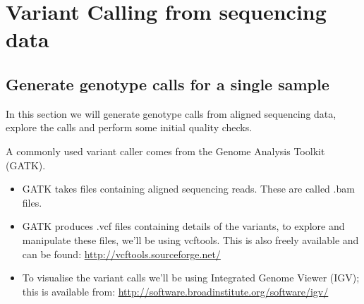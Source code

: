 \documentclass[]{book}
\newenvironment{Shaded}{\begin{snugshade}}{\end{snugshade}}
\newcommand{\KeywordTok}[1]{\textcolor[rgb]{0.13,0.29,0.53}{\textbf{#1}}}
\newcommand{\DataTypeTok}[1]{\textcolor[rgb]{0.13,0.29,0.53}{#1}}
\newcommand{\DecValTok}[1]{\textcolor[rgb]{0.00,0.00,0.81}{#1}}
\newcommand{\StringTok}[1]{\textcolor[rgb]{0.31,0.60,0.02}{#1}}
\newcommand{\OperatorTok}[1]{\textcolor[rgb]{0.81,0.36,0.00}{\textbf{#1}}}
\newcommand{\NormalTok}[1]{#1}
\providecommand{\tightlist}{%
  \setlength{\itemsep}{0pt}\setlength{\parskip}{0pt}}
\begin{document}
\begin{Shaded}
\end{Shaded}

\section{Variant Calling from sequencing
data}\label{variant-calling-from-sequencing-data}

\subsection{Generate genotype calls for a single
sample}\label{generate-genotype-calls-for-a-single-sample}

In this section we will generate genotype calls from aligned sequencing
data, explore the calls and perform some initial quality checks.

A commonly used variant caller comes from the Genome Analysis Toolkit
(GATK).

\begin{itemize}
\tightlist
\item
  GATK takes files containing aligned sequencing reads. These are called
  .bam files.
\item
  GATK produces .vcf files containing details of the variants, to
  explore and manipulate these files, we'll be using vcftools. This is
  also freely available and can be found:
  \url{http://vcftools.sourceforge.net/}
\item
  To visualise the variant calls we'll be using Integrated Genome Viewer
  (IGV); this is available from:
  \url{http://software.broadinstitute.org/software/igv/}
\end{itemize}
\end{document}
